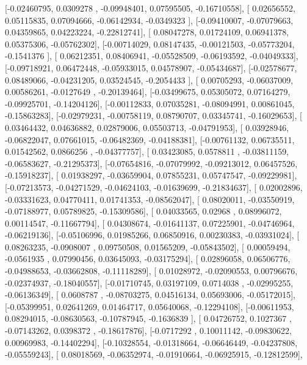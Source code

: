 \documentclass{article}
\begin{document}
       [-0.02460795,  0.0309278 , -0.09948401,  0.07595505, -0.16710558],
       [ 0.02656552,  0.05115835,  0.07094666, -0.06142934, -0.0349323 ],
       [-0.09410007, -0.07079663,  0.04359865,  0.04223224, -0.22812741],
       [ 0.08047278,  0.01724109,  0.06941378,  0.05375306, -0.05762302],
       [-0.00714029,  0.08147435, -0.00121503, -0.05773204, -0.1541376 ],
       [ 0.06212351,  0.08406941, -0.05528509, -0.06193592, -0.04049333],
       [-0.09718921,  0.06472448, -0.05933015,  0.04578907, -0.05434687],
       [-0.02578677,  0.08489066, -0.04231205,  0.03524545, -0.2054433 ],
       [ 0.00705293, -0.06037009,  0.00586261, -0.0127649 , -0.20139464],
       [-0.03499675,  0.05305072,  0.07164279, -0.09925701, -0.14204126],
       [-0.00112833,  0.07035281, -0.08094991,  0.00861045, -0.15863283],
       [-0.02979231, -0.00758119,  0.08790707,  0.03345741, -0.16029653],
       [ 0.03464432,  0.04636882,  0.02879006,  0.05503713, -0.04791953],
       [ 0.03928946, -0.06822047,  0.07661015, -0.06482369, -0.04188381],
       [-0.00761132,  0.06735511,  0.01542562,  0.0866256 , -0.04377757],
       [ 0.03423085,  0.0578811 , -0.03811159, -0.06583627, -0.21295373],
       [-0.07654816, -0.07079992, -0.09213012,  0.06457526, -0.15918237],
       [ 0.01938297, -0.03659904,  0.07855231,  0.05747547, -0.09229981],
       [-0.07213573, -0.04271529, -0.04624103, -0.01639699, -0.21834637],
       [ 0.02002896, -0.03331623,  0.04770411,  0.01741353, -0.08562047],
       [ 0.08020011, -0.03550919, -0.07188977,  0.05789825, -0.15309586],
       [ 0.04033565,  0.02968   ,  0.08996072,  0.00114547, -0.11667794],
       [ 0.04308674, -0.01641137,  0.07225901, -0.04746964, -0.06219136],
       [-0.05106996,  0.01985266,  0.06850916,  0.00230383, -0.03931024],
       [ 0.08263235, -0.0908007 ,  0.09750508,  0.01565209, -0.05843502],
       [ 0.00059494, -0.0561935 ,  0.07990456,  0.03645093, -0.03175294],
       [ 0.02896058,  0.06506776, -0.04988653, -0.03662808, -0.11118289],
       [ 0.01028972, -0.02090553,  0.00796676, -0.02374937, -0.18040557],
       [-0.01710745,  0.03197109,  0.0714038 , -0.02995255, -0.06136349],
       [ 0.0608787 , -0.08703275,  0.04516134,  0.05693006, -0.05172015],
       [-0.05399951,  0.02641269,  0.01464717,  0.05640068, -0.12294108],
       [-0.00611953,  0.08294015, -0.08630563, -0.10787945, -0.1636839 ],
       [ 0.04726752,  0.1027367 , -0.07143262,  0.0398372 , -0.18617876],
       [-0.0717292 ,  0.10011142, -0.09830622,  0.00969983, -0.14402294],
       [-0.10328554, -0.01318664, -0.06646449, -0.04237808, -0.05559243],
       [ 0.08018569, -0.06352974, -0.01910664, -0.06925915, -0.12812599],
\end{document}
